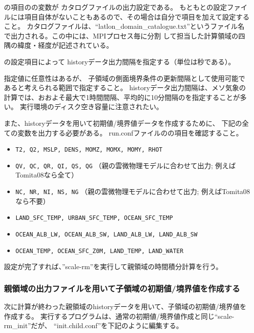 の項目のの変数が
カタログファイルの出力設定である。
もともとの設定ファイルには項目自体がないこともあるので、その場合は自分で項目を加えて設定すること。
カタログファイルは、``latlon\_domain\_catalogue.txt''というファイル名で出力される。この中には、MPIプロセス毎に分割
して担当した計算領域の四隅の緯度・経度が記述されている。

の設定項目によって
historyデータ出力間隔を指定する（単位は秒である）。


指定値に任意性はあるが、
子領域の側面境界条件の更新間隔として使用可能であると考えられる範囲で指定すること。
historyデータ出力間隔は、メソ気象の計算では、おおよそ最大で1時間間隔、平均的に10分間隔のを指定することが多い。
実行環境のディスク空き容量に注意されたい。


また、historyデータを用いて初期値/境界値データを作成するために、
下記の全ての変数を出力する必要がある。
run.confファイルのの項目を確認すること。

\begin{itemize}
 \item \verb|T2, Q2, MSLP, DENS, MOMZ, MOMX, MOMY, RHOT|
 \item \verb|QV, QC, QR, QI, QS, QG| {\small （親の雲微物理モデルに合わせて出力; 例えばTomita08なら全て）}
 \item \verb|NC, NR, NI, NS, NG| {\small （親の雲微物理モデルに合わせて出力; 例えばTomita08なら不要）}
 \item \verb|LAND_SFC_TEMP, URBAN_SFC_TEMP, OCEAN_SFC_TEMP|
 \item \verb|OCEAN_ALB_LW, OCEAN_ALB_SW, LAND_ALB_LW, LAND_ALB_SW|
 \item \verb|OCEAN_TEMP, OCEAN_SFC_Z0M, LAND_TEMP, LAND_WATER|
\end{itemize}

設定が完了すれば、''scale-rm''を実行して親領域の時間積分計算を行う。

\subsubsection{親領域の出力ファイルを用いて子領域の初期値/境界値を作成する}
次に計算が終わった親領域のhistoryデータを用いて、子領域の初期値/境界値を作成する。
実行するプログラムは、通常の初期値/境界値作成と同じ``scale-rm\_init''だが、
``init.child.conf''を下記のように編集する。\\

